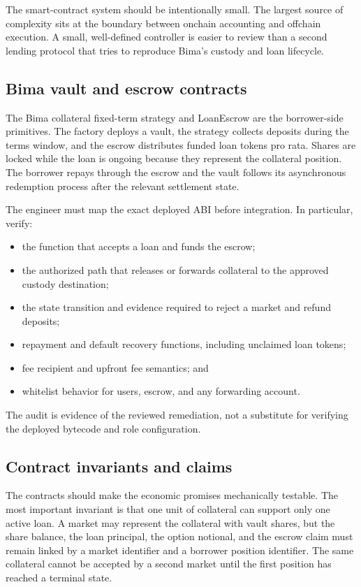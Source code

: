 \documentclass[11pt,oneside]{article}
\begin{document}
The smart-contract system should be intentionally small. The largest source of complexity sits at the boundary between onchain accounting and offchain execution. A small, well-defined controller is easier to review than a second lending protocol that tries to reproduce Bima's custody and loan lifecycle.

\subsection{Bima vault and escrow contracts}

The Bima collateral fixed-term strategy and LoanEscrow are the borrower-side primitives. The factory deploys a vault, the strategy collects deposits during the terms window, and the escrow distributes funded loan tokens pro rata. Shares are locked while the loan is ongoing because they represent the collateral position. The borrower repays through the escrow and the vault follows its asynchronous redemption process after the relevant settlement state.

The engineer must map the exact deployed ABI before integration. In particular, verify:

\begin{itemize}
\item the function that accepts a loan and funds the escrow;
\item the authorized path that releases or forwards collateral to the approved custody destination;
\item the state transition and evidence required to reject a market and refund deposits;
\item repayment and default recovery functions, including unclaimed loan tokens;
\item fee recipient and upfront fee semantics; and
\item whitelist behavior for users, escrow, and any forwarding account.
\end{itemize}

The audit is evidence of the reviewed remediation, not a substitute for verifying the deployed bytecode and role configuration.

\subsection{Contract invariants and claims}

The contracts should make the economic promises mechanically testable. The
most important invariant is that one unit of collateral can support only one
active loan. A market may represent the collateral with vault shares, but the
share balance, the loan principal, the option notional, and the escrow claim
must remain linked by a market identifier and a borrower position identifier.
The same collateral cannot be accepted by a second market until the first
position has reached a terminal state.
\end{document}
